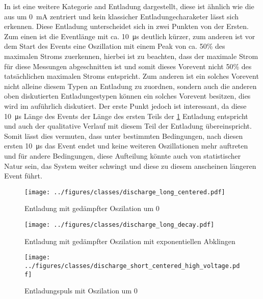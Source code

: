 In  ist eine weitere Kategorie and Entladung dargestellt, diese ist ähnlich wie die aus  um \SI{0}{\milli\ampere} zentriert und kein klassicher Entladungecharaketer lässt sich erkennen. Diese Entladung unterscheidet sich in zwei Punkten von der Ersten. Zum einen ist die Eventlänge mit ca. \SI{10}{\micro\second} deutlich kürzer, zum anderen ist vor dem Start des Events eine Oszillation mit einem Peak von ca. 50\% des maximalen Stroms zuerkennen, hierbei ist zu beachten, dass der maximale Strom für diese Messungen abgeschnitten ist und somit dieses Vorevent nicht 50\% des tatsächlichen maximalen Stroms entspricht. Zum anderen ist ein solches Vorevent nicht alleine diesem Typen an Entladung zu zuordnen, sondern auch die anderen oben diskutierten Entladungestypen können ein solches Vorevent besitzen, dies wird im  auführlich diskutiert. Der erste Punkt jedoch ist interessant, da diese \SI{10}{\micro\second} Länge des Events der Länge des ersten Teils der \ref{fig:discharge-long-centered} Entladung entspricht und auch der qualitative Verlauf mit diesem Teil der Entladung übereinspricht. Somit lässt dies vermuten, dass unter bestimmten Bedingungen, nach diesen ersten \SI{10}{\micro\second} das Event endet und keine weiteren Oszillationen mehr auftreten und für andere Bedingungen, diese Aufteilung könnte auch von statistischer Natur sein, das System weiter schwingt und diese zu diesem anscheinen längeren Event führt.

\begin{figure}[H]
    \centering
    \texttt{[image: ../figures/classes/discharge\_long\_centered.pdf]}
    \caption{Entladung mit gedämpfter Oszilation um 0}
    \label{fig:discharge-long-centered}
\end{figure}

\begin{figure}[H]
    \centering
    \texttt{[image: ../figures/classes/discharge\_long\_decay.pdf]}
    \caption{Entladung mit gedämpfter Oszilation mit exponentiellen Abklingen}
    \label{fig:discharge-long-decay}
\end{figure}

\begin{figure}[H]
    \centering
    \texttt{[image: ../figures/classes/discharge\_short\_centered\_high\_voltage.pdf]}
    \caption{Entladungspuls mit Oszilation um 0}
    \label{fig:discharge-short-centered}
\end{figure}





